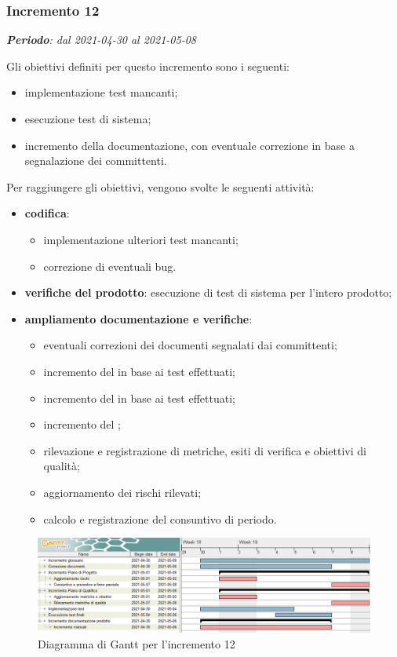 \subsubsection{Incremento 12}
\textit{\textbf{Periodo}: dal 2021-04-30 al 2021-05-08}

Gli obiettivi definiti per questo incremento sono i seguenti:
\begin{itemize}
\item implementazione test mancanti;
\item esecuzione test di sistema;
\item incremento della documentazione, con eventuale correzione in base a segnalazione dei committenti.
\end{itemize}

Per raggiungere gli obiettivi, vengono svolte le seguenti attività:
\begin{itemize}
\item \textbf{codifica}: 
\begin{itemize}
\item implementazione ulteriori test mancanti;
\item correzione di eventuali bug.
\end{itemize} 

\item \textbf{verifiche del prodotto}: esecuzione di test di sistema per l'intero prodotto;

\item \textbf{ampliamento documentazione e verifiche}:
\begin{itemize}
\item eventuali correzioni dei documenti segnalati dai committenti;
\item incremento del  in base ai test effettuati;
\item incremento del  in base ai test effettuati;
\item incremento del ;
\item rilevazione e registrazione di metriche, esiti di verifica e obiettivi di qualità;
\item aggiornamento dei rischi rilevati;
\item calcolo e registrazione del consuntivo di periodo.
\end{itemize}

\end{itemize}
\begin{figure}[H]
\centering

\centerline{\includegraphics[scale=0.6]{res/Pianificazione/Fasi/VerificaIncrementi/ganttIncremento12}}
\caption{Diagramma di Gantt per l'incremento 12}
\end{figure}